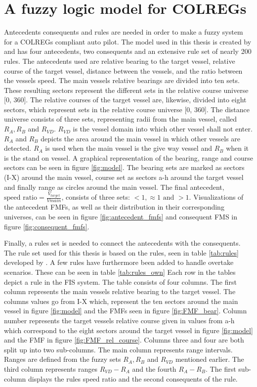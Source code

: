 \section{A fuzzy logic model for COLREGs}
\label{section:model}
Antecedents consequents and rules are needed in order to make a fuzzy system for a COLREGs compliant auto pilot. The model used in this thesis is created by \textcite{perera2012intelligent} and has four antecedents, two consequents and an extensive rule set of nearly 200 rules. The antecedents used are relative bearing to the target vessel, relative course of the target vessel, distance between the vessels, and the ratio between the vessels speed. The main vessels relative bearings are divided into ten sets. These resulting sectors represent the different sets in the relative course universe [0, 360]. The relative courses of the target vessel are, likewise, divided into eight sectors, which represent sets in the relative course universe [0, 360]. The distance universe consists of three sets, representing radii from the main vessel, called $R_A, R_B$ and $R_{VD}$. $R_{VD}$ is the vessel domain into which other vessel shall not enter. $R_A$ and $R_B$ depicts the area around the main vessel in which other vessels are detected. $R_A$ is used when the main vessel is the give way vessel and $R_B$ when it is the stand on vessel. A graphical representation of the bearing, range and course sectors can be seen in figure \ref{fig:model}. The bearing sets are marked as sectors (I-X) around the main vessel, course set as sectors a-h around the target vessel and finally range as circles around the main vessel. The final antecedent, $\text{speed ratio} =\frac{V_{target}}{V{main}}$, consists of three sets: $<1, \approx1 \text{ and } >1$.
Visualizations of the antecedent FMFs, as well as their distribution in their corresponding universes, can be seen in figure \ref{fig:antecedent_fmfs} and consequent FMS in figure \ref{fig:consequent_fmfs}.

Finally, a rules set is needed to connect the antecedents with the consequents. The rule set used for this thesis is based on the rules, seen in table \ref{tab:rules} developed by \textcite{perera2012intelligent}. A few rules have furthermore been added to handle overtake scenarios. These can be seen in table \ref{tab:rules_own}
Each row in the tables depict a rule in the FIS system.
The table consists of four columns. The first column represents the main vessels relative bearing to the target vessel. The columns values go from I-X which, represent the ten sectors around the main vessel in figure \ref{fig:model} and the FMFs seen in figure \ref{fig:FMF_bear}. Column number represents the target vessels relative course given in values from a-h which correspond to the eight sectors around the target vessel in figure \ref{fig:model} and the FMF in figure \ref{fig:FMF_rel_course}. Columns three and four are both split up into two sub-columns. The main column represents range intervals. Ranges are defined from the fuzzy sets $R_A, R_B$ and $R_{VD}$ mentioned earlier. The third column represents ranges $R_{VD}- R_A$ and the fourth $R_A-R_B$. The first sub-column displays the rules speed ratio and the second consequents of the rule.

